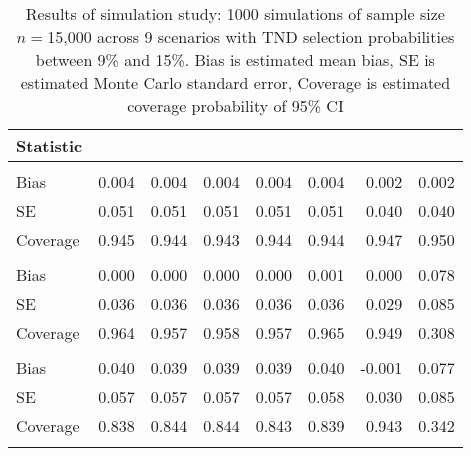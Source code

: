 \begin{table}
\caption{Results of simulation study: 1000 simulations of sample size $n=$15,000 across 9 scenarios with TND selection probabilities between 9\% and 15\%. Bias is estimated mean bias, SE is estimated Monte Carlo standard error, Coverage is estimated coverage probability of 95\% CI}\label{tab:sims}
\centering
\begin{tabular}{lddddddd}
\toprule
Statistic &   &   &   &  &  &  &  \\
\midrule
\addlinespace[0.3em]
\\
\hspace{1em}Bias & 0.004 & 0.004 & 0.004 & 0.004 & 0.004 & 0.002 & 0.002\\
\hspace{1em}SE & 0.051 & 0.051 & 0.051 & 0.051 & 0.051 & 0.040 & 0.040\\
\hspace{1em}Coverage & 0.945 & 0.944 & 0.943 & 0.944 & 0.944 & 0.947 & 0.950\\
\addlinespace[0.3em]
\\
\hspace{1em}Bias & 0.000 & 0.000 & 0.000 & 0.000 & 0.001 & 0.000 & 0.078\\
\hspace{1em}SE & 0.036 & 0.036 & 0.036 & 0.036 & 0.036 & 0.029 & 0.085\\
\hspace{1em}Coverage & 0.964 & 0.957 & 0.958 & 0.957 & 0.965 & 0.949 & 0.308\\
\addlinespace[0.3em]
\\
\hspace{1em}Bias & 0.040 & 0.039 & 0.039 & 0.039 & 0.040 & -0.001 & 0.077\\
\hspace{1em}SE & 0.057 & 0.057 & 0.057 & 0.057 & 0.058 & 0.030 & 0.085\\
\hspace{1em}Coverage & 0.838 & 0.844 & 0.844 & 0.843 & 0.839 & 0.943 & 0.342\\
\addlinespace[0.3em]
\\

\end{tabular}
\end{table}
